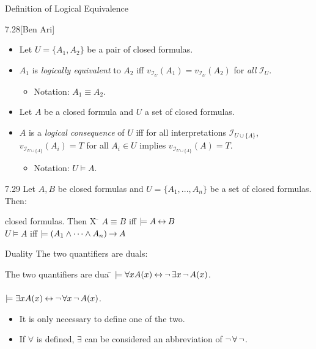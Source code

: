\documentclass[style=sailor,size=12pt]{powerdot}
\begin{document}
\begin{wideslide}[bm=,toc=]{Definition of Logical Equivalence}
\begin{defn}{7.28}[Ben Ari]
\end{defn}
\vspace{-2ex}
\begin{itemize}
\item<2-> Let $U = \{A_1,A_2\}$ be a pair of closed formulas. 
\item<3-> $A_1$ is \emph{logically equivalent} to $A_2$ iff \pause[3] $v_{{\mathcal{I}_U}}(A_1) =
v_{{\mathcal{I}_U}}(A_2)$ for \emph{all} $\mathcal{I}_U$.
\begin{itemize}
\item<5-> Notation: $A_1 \equiv A_2$.
\end{itemize}
\item<6-> Let $A$ be a closed formula and $U$ a set of closed formulas.
\item<7-> $A$ is a \emph{logical consequence} of $U$ iff \pause[4] for all interpretations
$\mathcal{I}_{U \cup \{A\}}$, $v_{\mathcal{I}_{U \cup \{A\}}}(A_i) = T$ for
all $A_i \in U$ implies $v_{\mathcal{I}_{U \cup \{A\}}}(A) = T$. 
\begin{itemize}
\item<9-> Notation: $U \models A$.
\end{itemize}
\end{itemize}
\vspace{-5mm}
\pause[2]
\begin{thm}{7.29}
Let $A,B$ be closed formulas and $U = \{A_1,...,A_n\}$ be a set of
closed formulas. Then:
\end{thm}
\vspace{-5ex}
\begin{tabbing}
closed formulas. Then X \= \kill
\> $A \equiv B$ iff $\models A \mathbin{\leftrightarrow} B$\\
\> $U \models A$ iff $\models (A_1 \land \cdots \land A_n) \mathbin{\rightarrow} A$
\end{tabbing}

\end{wideslide}

\begin{wideslide}[bm=,toc=]{Duality}
The two quantifiers are duals:
\pause
\begin{tabbing}
The two quantifiers are dua \= \kill
\> $\models \forall x A(x) \mathbin{\leftrightarrow} \mathop{\neg} \exists x \mathop{\neg} A(x)$.\\
\> ~\\ 
\pause
\> $\models \exists x A(x) \mathbin{\leftrightarrow} \mathop{\neg} \forall x \mathop{\neg} A(x)$.
\end{tabbing}
\pause
\begin{itemize}
\item It is only necessary to define one of the two.
\item If $\forall$ is defined, $\exists$ can be considered an abbreviation of
      $\mathop{\neg} \forall \mathop{\neg}$.
\end{itemize}

\end{wideslide}
\end{document}
